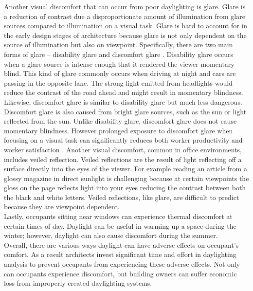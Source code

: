 Another visual discomfort that can occur from poor daylighting is glare.  Glare is a reduction of contrast due a disproportionate amount of illumination from glare sources compared to illumination on a visual task. Glare is hard to account for in the early design stages of architecture because glare is not only dependent on the source of illumination but also on viewpoint.  Specifically, there are two main forms of glare -- disability glare and discomfort glare \cite{Robbins}.  Disability glare occurs when a glare source is intense enough that it rendered the viewer momentary blind.  This kind of glare commonly occurs when driving at night and cars are passing in the opposite lane.  The strong light emitted from headlights would reduce the contrast of the road ahead and might result in momentary blindness. Likewise, discomfort glare is similar to disability glare but much less dangerous.  Discomfort glare is also caused from bright glare sources, such as the sun or light reflected from the sun.  Unlike disability glare, discomfort glare does not cause momentary blindness.  However prolonged exposure to discomfort glare when focusing on a visual task can significantly reduces both worker productivity and worker satisfaction \cite{boyce}.  Another visual discomfort, common in office environments, includes veiled reflection.  Veiled reflections are the result of light reflecting off a surface directly into the eyes of the viewer. For example reading an article from a glossy magazine in direct sunlight is challenging because at certain viewpoints the gloss on the page reflects light into your eyes reducing the contrast between both the black and white letters.  Veiled reflections, like glare, are difficult to predict because they are viewpoint dependent. \\

Lastly, occupants sitting near windows can experience thermal discomfort at certain times of day.  Daylight can be useful in warming up a space during the winter; however, daylight can also cause discomfort during the summer. \\

Overall, there are various ways daylight can have adverse effects on occupant's comfort. As a result architects invest significant time and effort in daylighting analysis to prevent occupants from experiencing these adverse effects.  Not only can occupants experience discomfort, but building owners can suffer economic loss from improperly created daylighting systems. \\

